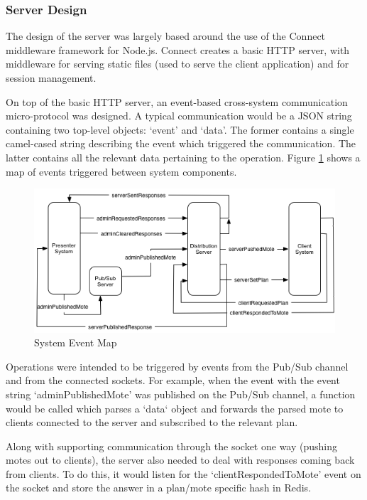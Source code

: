 \documentclass[a4papert,11pt,notitlepage]{article}
\begin{document}
\subsubsection{Server Design}
The design of the server was largely based around the use of the Connect\cite{connect:web} middleware framework for Node.js. Connect creates a basic HTTP server, with middleware for serving static files (used to serve the client application) and for session management.

On top of the basic HTTP server, an event-based cross-system communication micro-protocol was designed. A typical communication would be a JSON string containing two top-level objects: `event' and `data'. The former contains a single camel-cased string describing the event which triggered the communication. The latter contains all the relevant data pertaining to the operation. Figure \ref{fig:eventmap} shows a map of events triggered between system components.

\begin{figure}[h]
\caption{System Event Map}
\label{fig:eventmap}
\centering
\includegraphics[width=470pt]{eventmap}
\end{figure}

Operations were intended to be triggered by events from the Pub/Sub channel and from the connected sockets. For example, when the event  with the event string `adminPublishedMote' was published on the Pub/Sub channel, a function would be called which parses a `data` object and forwards the parsed mote to clients connected to the server and subscribed to the relevant plan.

Along with supporting communication through the socket one way (pushing motes out to clients), the server also needed to deal with responses coming back from clients. To do this, it would listen for the `clientRespondedToMote' event on the socket and store the answer in a plan/mote specific hash in Redis.
\end{document}
